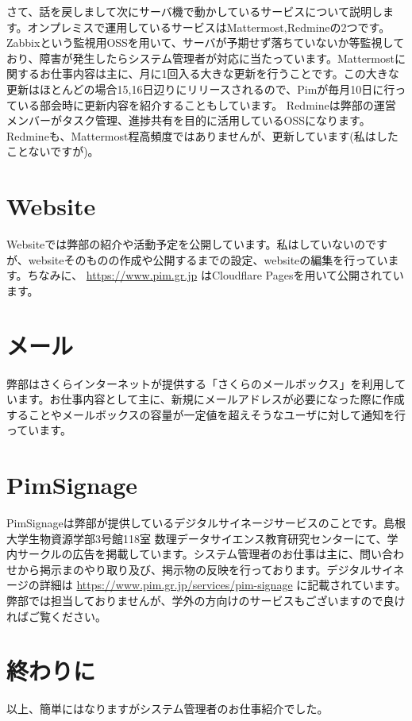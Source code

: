 \documentclass[a4paper,11pt]{jsarticle}
\begin{document}
さて、話を戻しまして次にサーバ機で動かしているサービスについて説明します。オンプレミスで運用しているサービスはMattermost,Redmineの2つです。Zabbixという監視用OSSを用いて、サーバが予期せず落ちていないか等監視しており、障害が発生したらシステム管理者が対応に当たっています。Mattermostに関するお仕事内容は主に、月に1回入る大きな更新を行うことです。この大きな更新はほとんどの場合15,16日辺りにリリースされるので、Pimが毎月10日に行っている部会時に更新内容を紹介することもしています。
Redmineは弊部の運営メンバーがタスク管理、進捗共有を目的に活用しているOSSになります。Redmineも、Mattermost程高頻度ではありませんが、更新しています(私はしたことないですが)。

\section{Website}
Websiteでは弊部の紹介や活動予定を公開しています。私はしていないのですが、websiteそのものの作成や公開するまでの設定、websiteの編集を行っています。ちなみに、 \url{https://www.pim.gr.jp} はCloudflare Pagesを用いて公開されています。

\section{メール}
弊部はさくらインターネットが提供する「さくらのメールボックス」を利用しています。お仕事内容として主に、新規にメールアドレスが必要になった際に作成することやメールボックスの容量が一定値を超えそうなユーザに対して通知を行っています。

\section{PimSignage}
PimSignageは弊部が提供しているデジタルサイネージサービスのことです。島根大学生物資源学部3号館118室 数理データサイエンス教育研究センターにて、学内サークルの広告を掲載しています。システム管理者のお仕事は主に、問い合わせから掲示まのやり取り及び、掲示物の反映を行っております。デジタルサイネージの詳細は \url{https://www.pim.gr.jp/services/pim-signage} に記載されています。弊部では担当しておりませんが、学外の方向けのサービスもございますので良ければご覧ください。

\section{終わりに}
以上、簡単にはなりますがシステム管理者のお仕事紹介でした。
\end{document}
